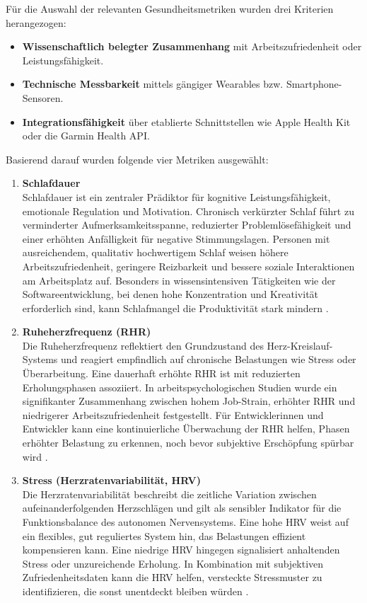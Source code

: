 \documentclass[12pt,a4paper]{report}
\begin{document}
Für die Auswahl der relevanten Gesundheitsmetriken wurden drei Kriterien herangezogen:

\begin{itemize}
  \item \textbf{Wissenschaftlich belegter Zusammenhang} mit Arbeitszufriedenheit oder Leistungsfähigkeit.
  \item \textbf{Technische Messbarkeit} mittels gängiger Wearables bzw. Smartphone-Sensoren.
  \item \textbf{Integrationsfähigkeit} über etablierte Schnittstellen wie Apple Health Kit oder die Garmin Health API.
\end{itemize}

Basierend darauf wurden folgende vier Metriken ausgewählt:

\begin{enumerate}
  \item \textbf{Schlafdauer}\\
        Schlafdauer ist ein zentraler Prädiktor für kognitive Leistungsfähigkeit, emotionale Regulation und Motivation. Chronisch 
        verkürzter Schlaf führt zu verminderter Aufmerksamkeitsspanne, reduzierter Problemlösefähigkeit und einer erhöhten 
        Anfälligkeit für negative Stimmungslagen. Personen mit ausreichendem, qualitativ hochwertigem Schlaf weisen höhere
        Arbeitszufriedenheit, geringere Reizbarkeit und bessere soziale Interaktionen am Arbeitsplatz auf. Besonders in
        wissensintensiven Tätigkeiten wie der Softwareentwicklung, bei denen hohe Konzentration und Kreativität erforderlich sind,
        kann Schlafmangel die Produktivität stark mindern \cite{opoku_sleep_2023}.

  \item \textbf{Ruheherzfrequenz (RHR)}\\
        Die Ruheherzfrequenz reflektiert den Grundzustand des Herz-Kreislauf-Systems und reagiert empfindlich auf chronische 
        Belastungen wie Stress oder Überarbeitung. Eine dauerhaft erhöhte RHR ist mit  reduzierten Erholungsphasen assoziiert.
        In arbeitspsychologischen Studien wurde ein signifikanter Zusammenhang zwischen hohem Job-Strain, erhöhter RHR und niedrigerer Arbeitszufriedenheit festgestellt. Für Entwicklerinnen und Entwickler kann eine kontinuierliche Überwachung der RHR
        helfen, Phasen erhöhter Belastung zu erkennen, noch bevor subjektive Erschöpfung spürbar wird \cite{eriksson_rhr_2016}.

  \item \textbf{Stress (Herzratenvariabilität, HRV)}\\
        Die Herzratenvariabilität beschreibt die zeitliche Variation zwischen aufeinanderfolgenden Herzschlägen und gilt als
        sensibler Indikator für die Funktionsbalance des autonomen Nervensystems. Eine hohe HRV weist auf ein flexibles, gut
        reguliertes System hin, das Belastungen effizient kompensieren kann. Eine niedrige HRV hingegen signalisiert anhaltenden
        Stress oder unzureichende Erholung. In Kombination mit subjektiven Zufriedenheitsdaten kann die HRV helfen, versteckte
        Stressmuster zu identifizieren, die sonst unentdeckt bleiben würden \cite{borchini_hrv_2012}.


\end{enumerate}
\end{document}
